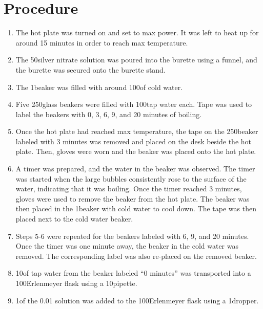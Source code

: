\documentclass[11pt]{article}
\begin{document}
\section{Procedure}

\begin{enumerate}
	\item The hot plate was turned on and set to max power. It was left to heat up for around 15 minutes in order to reach max temperature.

	\item The 50\ml silver nitrate solution was poured into the burette using a funnel, and the burette was secured onto the burette stand.

	\item The 1\litre beaker was filled with around 100\ml of cold water.

	\item Five 250\ml glass beakers were filled with 100\ml tap water each. Tape was used to label the beakers with 0, 3, 6, 9, and 20 minutes of boiling.

	\item Once the hot plate had reached max temperature, the tape on the 250\ml beaker labeled with 3 minutes was removed and placed on the desk beside the hot plate. Then, gloves were worn and the beaker was placed onto the hot plate.

	\item A timer was prepared, and the water in the beaker was observed. The timer was started when the large bubbles consistently rose to the surface of the water, indicating that it was boiling. Once the timer reached 3 minutes, gloves were used to remove the beaker from the hot plate. The beaker was then placed in the 1\litre beaker with cold water to cool down. The tape was then placed next to the cold water beaker.

	\item Steps 5-6 were repeated for the beakers labeled with 6, 9, and 20 minutes. Once the timer was one minute away, the beaker in the cold water was removed. The corresponding label was also re-placed on the removed beaker.

	\item 10\ml of tap water from the beaker labeled ``0 minutes'' was transported into a 100\ml Erlenmeyer flask using a 10\ml pipette.

	\item 1\ml of the 0.01\mpl {} solution was added to the 100\ml Erlenmeyer flask using a 1\ml dropper.


\end{enumerate}
\end{document}

